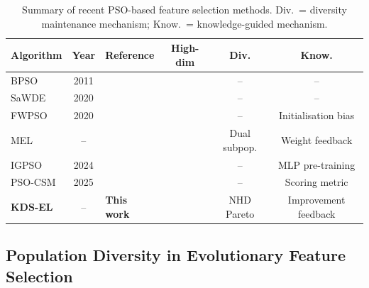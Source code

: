 \documentclass[a4paper,fleqn]{cas-dc}
\begin{document}
\begin{sloppypar}
	\begin{table}[t]
	\centering
	\caption{Summary of recent PSO-based feature selection methods.
	Div.~= diversity maintenance mechanism; Know.~= knowledge-guided mechanism.}
	\label{tab:literature}
	\setlength{\tabcolsep}{3pt}
	\begin{tabular}{lclccc}
	\toprule
	\textbf{Algorithm} & \textbf{Year} & \textbf{Reference} & \textbf{High-dim} & \textbf{Div.} & \textbf{Know.} \\
	\midrule
	BPSO     & 2011 & \citep{chuang2011binary}          & \checkmark & -- & -- \\
	SaWDE    & 2020 & \citep{zhan2020sa}                & \checkmark & -- & -- \\
	FWPSO    & 2020 & \citep{huang2020enhanced}         & \checkmark & -- & Initialisation bias \\
	MEL      & --   & \citep{MEL_CITE}                  & \checkmark & Dual subpop. & Weight feedback \\
	IGPSO    & 2024 & \citep{IGPSO_CITE}                & \checkmark & -- & MLP pre-training \\
	PSO-CSM  & 2025 & \citep{PSOCSM_CITE}               & \checkmark & -- & Scoring metric \\
	\textbf{KDS-EL} & -- & \textbf{This work}            & \checkmark & NHD Pareto & Improvement feedback \\
	\bottomrule
	\end{tabular}
	\end{table}


	\subsection{Population Diversity in Evolutionary Feature Selection}
	\label{sec:related:diversity}


\end{sloppypar}
\end{document}
